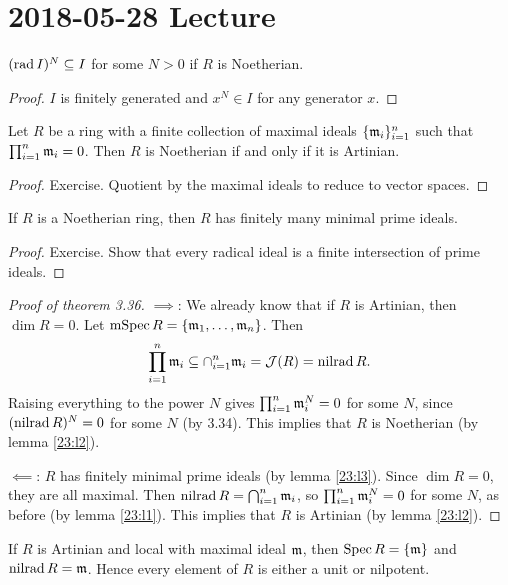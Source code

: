 \section{2018-05-28 Lecture}

\begin{lem}\label{23:l1}
  $(\operatorname{rad} I)^N \subseteq I$ for some $N>0$ if $R$ is Noetherian.
\end{lem}

\begin{proof}
  $I$ is finitely generated and $x^N \in I$ for any generator $x$.
\end{proof}

\begin{lem}\label{23:l2}
  Let $R$ be a ring with a finite collection of maximal ideals $\{\mathfrak{m}_i\}_{i=1}^n$ such that $\prod_{i=1}^n \mathfrak{m}_i=0$.
  Then $R$ is Noetherian if and only if it is Artinian.
\end{lem}

\begin{proof}
  Exercise.
  Quotient by the maximal ideals to reduce to vector spaces.
\end{proof}

\begin{lem}\label{23:l3}
  If $R$ is a Noetherian ring, then $R$ has finitely many minimal prime ideals.
\end{lem}

\begin{proof}
  Exercise.
  Show that every radical ideal is a finite intersection of prime ideals.
\end{proof}

\begin{proof}[Proof of theorem 3.36]
  $\implies$: We already know that if $R$ is Artinian, then $\dim R=0$.
  Let $\operatorname{mSpec} R=\{\mathfrak{m}_1,\ldots,\mathfrak{m}_n\}$.
  Then
  \[ \prod_{i=1}^n \mathfrak{m}_i \subseteq \cap_{i=1}^n \mathfrak{m}_i = \mathcal{J}(R) = \operatorname{nilrad} R. \]
  Raising everything to the power $N$ gives $\prod_{i=1}^n \mathfrak{m}_i^N = 0$ for some $N$, since $(\operatorname{nilrad} R)^N=0$ for some $N$ (by 3.34).
  This implies that $R$ is Noetherian (by lemma \ref{23:l2}).

  $\impliedby$:
  $R$ has finitely minimal prime ideals (by lemma \ref{23:l3}).
  Since $\dim R=0$, they are all maximal.
  Then $\operatorname{nilrad} R = \bigcap_{i=1}^n \mathfrak{m}_i$, so $\prod_{i=1}^n \mathfrak{m}_i^N=0$ for some $N$, as before (by lemma \ref{23:l1}).
  This implies that $R$ is Artinian (by lemma \ref{23:l2}).
\end{proof}

\begin{rmk}
  If $R$ is Artinian and local with maximal ideal $\mathfrak{m}$, then $\operatorname{Spec} R = \{\mathfrak{m}\}$ and $\operatorname{nilrad} R = \mathfrak{m}$.
  Hence every element of $R$ is either a unit or nilpotent.
\end{rmk}

